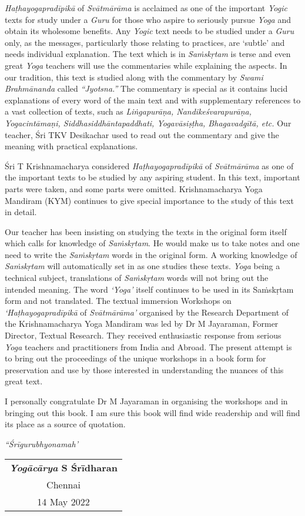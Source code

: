 \textit{Haṭhayogapradīpikā} of \textit{Svātmārāma} is acclaimed as one of the important \textit{Yogic} texts for study under a \textit{Guru} for those who aspire to seriously pursue \textit{Yoga} and obtain its wholesome benefits. Any \textit{Yogic} text needs to be studied under a \textit{Guru} only, as the messages, particularly those relating to practices, are ‘subtle’ and needs individual explanation. The text which is in \textit{Saṁskṛtam} is terse and even great \textit{Yoga} teachers will use the commentaries while explaining the aspects. In our tradition, this text is studied along with the commentary by \textit{Swami Brahmānanda} called \textit{“Jyotsna.”} The commentary is special as it contains lucid explanations of every word of the main text and with supplementary references to a vast collection of texts, such as \textit{Liṅgapurāṇa, Nandikeśvarapurāṇa, Yogacintāmaṇi, Siddhasiddhāntapaddhati, 
Yogavāsiṣṭha, Bhagavadgītā, etc.} Our teacher, Śri TKV Desikachar used to read out the commentary and give the meaning with practical explanations.

Śri T Krishnamacharya considered \textit{Haṭhayogapradīpikā} of \textit{Svātmārāma} as one of the important texts to be studied by any aspiring student.  In this text, important parts were taken, and some parts were omitted. Krishnamacharya Yoga Mandiram (KYM) continues to give special importance to the study of this text in detail.

Our teacher has been insisting on studying the texts in the original form itself which calls for knowledge of \textit{Saṁskṛtam}.  He would make us to take notes and one need to write the \textit{Saṁskṛtam} words in the original form.  A working knowledge of \textit{Saṁskṛtam} will automatically set in as one studies these texts. \textit{Yoga} being a technical subject, translations of \textit{Saṁskṛtam} words will not bring out the intended meaning. The word \textit{‘Yoga’} itself continues to be used in its Saṁskṛtam form and not translated.
\newpage
The textual immersion Workshops on \textit{‘Haṭhayogapradīpikā} of \textit{Svātmā\-rāma’} organised by the Research Department of the Krishnamacharya Yoga Mandiram was led by Dr M Jayaraman, Former Director, Textual Research. They received enthusiastic response from serious \textit{Yoga} teachers and practitioners from India and Abroad. The present attempt is to bring out the proceedings of the unique workshops in a book form for preservation and use by those interested in understanding the nuances of this great text.

I personally congratulate Dr M Jayaraman in organising the workshops and in bringing out this book.  I am sure this book will find wide readership and will find its place as a source of quotation.
\bigskip

\centerline{\textit{“Śrīgurubhyonamah’}}
\bigskip

\begin{flushright} 
\begin{tabular}{c}
\textbf{\textit{Yogācārya} S Śrīdharan}\\
Chennai\\
14 May 2022
\end{tabular}
\end{flushright}
